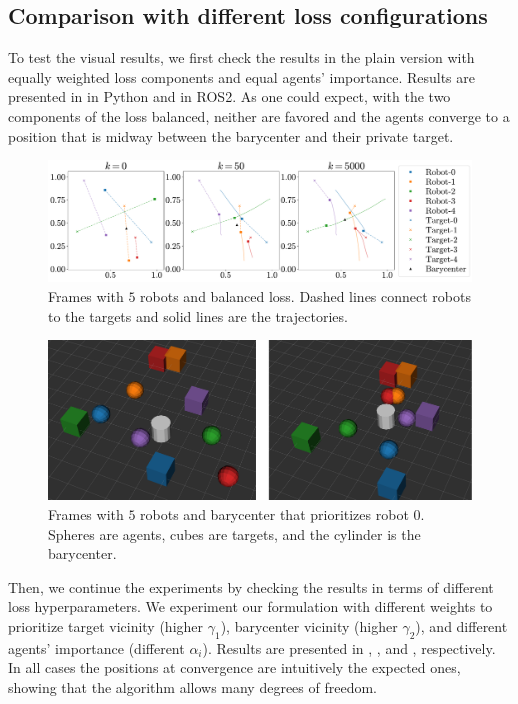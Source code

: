\documentclass[a4paper,11pt,oneside]{book}
\begin{document}
\subsection{Comparison with different loss configurations}

To test the visual results, we first check the results in the plain version with equally weighted loss components and equal agents' importance. Results are presented in  in Python and  in ROS2. As one could expect, with the two components of the loss balanced, neither are favored and the agents converge to a position that is midway between the barycenter and their private target.
\begin{figure}[H]
      \centering
      \includegraphics[width=0.9\linewidth]{./figs/aggregative/plain_anim/anim.pdf} 
      \caption{Frames with $5$ robots and balanced loss. Dashed lines connect robots to the targets and solid lines are the trajectories.}
      \label{fig:anim_plain}
\end{figure}

\begin{figure}[H]
      \centering
      \includegraphics[width=0.75\linewidth]{./figs/aggregative/plain_anim/ros2.png} 
      \caption{Frames with $5$ robots and barycenter that prioritizes robot $0$. Spheres are agents, cubes are targets, and the cylinder is the barycenter.}
      \label{fig:anim_plain_ros2}
\end{figure}

Then, we continue the experiments by checking the results in terms of different loss hyperparameters. We experiment our formulation with different weights to prioritize target vicinity (higher $\gamma_1$), barycenter vicinity (higher $\gamma_2$), and different agents' importance (different $\alpha_i$). Results are presented in , , and , respectively. In all cases the positions at convergence are intuitively the expected ones, showing that the algorithm allows many degrees of freedom.
\end{document}

